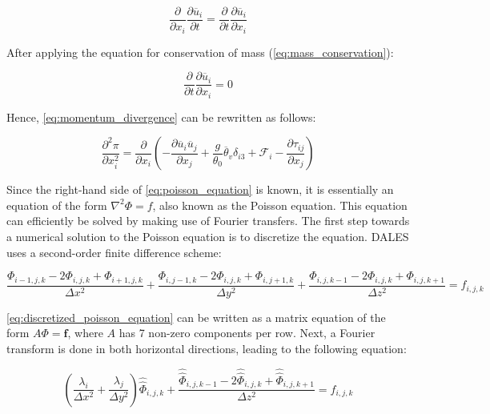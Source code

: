 \begin{equation*}
    \frac{\partial}{\partial x_i}\frac{\partial \overline{u}_i}{\partial t} = \frac{\partial}{\partial t}\frac{\partial \overline{u}_i}{\partial x_i}
\end{equation*}

\noindent After applying the equation for conservation of mass (\autoref{eq:mass_conservation}):

\begin{equation}
    \frac{\partial}{\partial t} \frac{\partial \overline{u}_i}{\partial x_i} = 0
\end{equation}

\noindent Hence, \autoref{eq:momentum_divergence} can be rewritten as follows:

\begin{equation}
    \frac{\partial^2 \pi}{\partial x_i^2} = \frac{\partial}{\partial x_i} \left( - \frac{\partial \overline{u}_i \overline{u}_j}{\partial x_j} + \frac{g}{\theta_0}\overline{\theta}_v \delta_{i3} + \mathcal{F}_i - \frac{\partial \tau_{ij}}{\partial x_j} \right)
    \label{eq:poisson_equation}
\end{equation}

\noindent Since the right-hand side of \autoref{eq:poisson_equation} is known, it is essentially an equation of the form $\nabla^2 \Phi = f$, also known as the Poisson equation. This equation can efficiently be solved by making use of Fourier transfers. The first step towards a numerical solution to the Poisson equation is to discretize the equation. DALES uses a second-order finite difference scheme:

\begin{equation}
    \frac{\Phi_{i-1,j,k} - 2 \Phi_{i,j,k} + \Phi_{i+1,j,k}}{\Delta x^2} + \frac{\Phi_{i,j-1,k} - 2 \Phi_{i,j,k} + \Phi_{i,j+1,k}}{\Delta y^2} + \frac{\Phi_{i,j,k-1} - 2 \Phi_{i,j,k} + \Phi_{i,j,k+1}}{\Delta z^2} = f_{i,j,k}
    \label{eq:discretized_poisson_equation}
\end{equation}

\autoref{eq:discretized_poisson_equation} can be written as a matrix equation of the form $A \Phi = \mathbf{f}$, where $A$ has 7 non-zero components per row. Next, a Fourier transform is done in both horizontal directions, leading to the following equation: 

\begin{equation}
    \left( \frac{\lambda_i}{\Delta x^2} + \frac{\lambda_j}{\Delta y^2} \right) \hat{\hat{\Phi}}_{i,j,k} + \frac{\hat{\hat{\Phi}}_{i,j,k-1} - 2 \hat{\hat{\Phi}}_{i,j,k} + \hat{\hat{\Phi}}_{i,j,k+1}}{\Delta z^2} = f_{i,j,k}
    \label{eq:poisson_fourier_space}
\end{equation}

